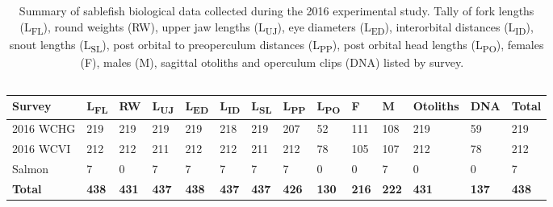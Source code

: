 \documentclass[12pt]{article}\usepackage[]{graphicx}\usepackage[]{color}
\begin{document}
\begin{table}[!h]

\caption{\label{tab:table3}Summary of sablefish biological data collected during the 2016 experimental study. Tally of fork lengths (L\textsubscript{FL}), round weights (RW), upper jaw lengths (L\textsubscript{UJ}), eye diameters (L\textsubscript{ED}), interorbital distances (L\textsubscript{ID}), snout lengths (L\textsubscript{SL}), post orbital to preoperculum distances (L\textsubscript{PP}), post orbital head lengths (L\textsubscript{PO}), females (F), males (M), sagittal otoliths and operculum clips (DNA) listed by survey. ~\\
\hspace*{0.333em}\\}
\fontsize{10}{12}\selectfont
\begin{tabular}[t]{llllllllllllll}
\toprule
\textbf{Survey} & \textbf{L\textsubscript{FL}} & \textbf{RW} & \textbf{L\textsubscript{UJ}} & \textbf{L\textsubscript{ED}} & \textbf{L\textsubscript{ID}} & \textbf{L\textsubscript{SL}} & \textbf{L\textsubscript{PP}} & \textbf{L\textsubscript{PO}} & \textbf{F} & \textbf{M} & \textbf{Otoliths} & \textbf{DNA} & \textbf{Total}\\
\midrule
2016 WCHG & 219 & 219 & 219 & 219 & 218 & 219 & 207 & 52 & 111 & 108 & 219 & 59 & 219\\
2016 WCVI & 212 & 212 & 211 & 212 & 212 & 211 & 212 & 78 & 105 & 107 & 212 & 78 & 212\\
Salmon & 7 & 0 & 7 & 7 & 7 & 7 & 7 & 0 & 0 & 7 & 0 & 0 & 7\\
\midrule
\textbf{Total} & \textbf{438} & \textbf{431} & \textbf{437} & \textbf{438} & \textbf{437} & \textbf{437} & \textbf{426} & \textbf{130} & \textbf{216} & \textbf{222} & \textbf{431} & \textbf{137} & \textbf{438}\\
\bottomrule
\end{tabular}
\end{table}
~\\
\hspace*{0.333em}\\
\hspace*{0.333em}\\
\end{document}
